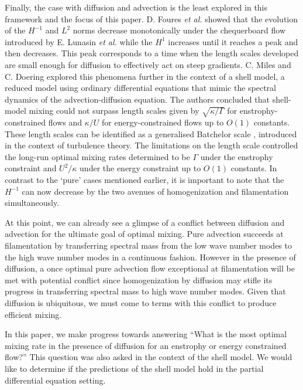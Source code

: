\documentclass[12pt]{iopart}
\begin{document}
Finally, the case with diffusion and advection is the least explored in this framework and the focus of this paper. D. Foures {\it et al.} \cite{DF2014} showed that the evolution of the $H^{-1}$ and $L^2$ norms decrease monotonically under the chequerboard flow introduced by E. Lunasin {\it et al.} \cite{JMP2012} while the $H^{1}$ increases until it reaches a peak and then decreases. This peak corresponds to a  time when the length scales developed are small enough for diffusion to effectively act on steep gradients. C. Miles and C. Doering \cite{Miles2017a} explored this phenomena further in the context of a shell model, a reduced model using ordinary differential equations that mimic the spectral dynamics of the advection-diffusion equation. The authors concluded that shell-model mixing could not surpass length scales given by $\sqrt{\kappa/ \Gamma}$ for enstrophy-constrained flows and $\kappa/U$ for energy-constrained flows up to $O(1)$ constants. These length scales can be identified as a generalised Batchelor scale \cite{Batchelor1959a}, introduced in the context of turbulence theory. The limitations on the length scale controlled the long-run optimal mixing rates determined to be $\Gamma$ under the enstrophy constraint and $U^2/\kappa$ under the energy constraint up to $O(1)$ constants. In contrast to the `pure' cases mentioned earlier, it is important to note that the $H^{-1}$ can now decrease by the two avenues of homogenization and filamentation simultaneously. 

At this point, we can already see a glimpse of a conflict between diffusion and advection for the ultimate goal of optimal mixing. Pure advection succeeds at filamentation by transferring spectral mass from the low wave number modes to the high wave number modes in a continuous fashion. However in the presence of diffusion, a once optimal pure advection flow exceptional at filamentation will be met with potential conflict since homogenization by diffusion may stifle its progress in transferring spectral mass to high wave number modes. Given that diffusion is ubiquitous, we must come to terms with this conflict to produce efficient mixing.

In this paper, we make progress towards answering ``What is the most optimal mixing rate in the presence of diffusion for an enstrophy or energy constrained flow?'' This question was also asked in the context of the shell model. We would like to determine if the predictions of the shell model hold in the partial differential equation setting. 
\end{document}

